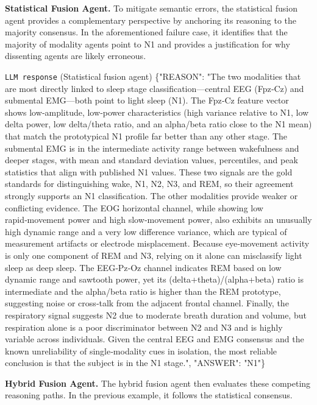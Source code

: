 \noindent \textbf{Statistical Fusion Agent.} To mitigate semantic errors, the statistical fusion agent provides a complementary perspective by anchoring its reasoning to the majority consensus. In the aforementioned failure case, it identifies that the majority of modality agents point to N1 and provides a justification for why dissenting agents are likely erroneous.

\begin{promptbox}{\texttt{LLM response} (Statistical fusion agent)}
\{"REASON": "The two modalities that are most directly linked to sleep stage classification—central EEG (Fpz‑Cz) and submental EMG—both point to light sleep (N1). The Fpz‑Cz feature vector shows low‑amplitude, low‑power characteristics (high variance relative to N1, low delta power, low delta/theta ratio, and an alpha/beta ratio close to the N1 mean) that match the prototypical N1 profile far better than any other stage. The submental EMG is in the intermediate activity range between wakefulness and deeper stages, with mean and standard deviation values, percentiles, and peak statistics that align with published N1 values. These two signals are the gold standards for distinguishing wake, N1, N2, N3, and REM, so their agreement strongly supports an N1 classification. The other modalities provide weaker or conflicting evidence. The EOG horizontal channel, while showing low rapid‑movement power and high slow‑movement power, also exhibits an unusually high dynamic range and a very low difference variance, which are typical of measurement artifacts or electrode misplacement. Because eye‑movement activity is only one component of REM and N3, relying on it alone can misclassify light sleep as deep sleep. The EEG‑Pz‑Oz channel indicates REM based on low dynamic range and sawtooth power, yet its (delta+theta)/(alpha+beta) ratio is intermediate and the alpha/beta ratio is higher than the REM prototype, suggesting noise or cross‑talk from the adjacent frontal channel. Finally, the respiratory signal suggests N2 due to moderate breath duration and volume, but respiration alone is a poor discriminator between N2 and N3 and is highly variable across individuals. Given the central EEG and EMG consensus and the known unreliability of single‑modality cues in isolation, the most reliable conclusion is that the subject is in the N1 stage.", "ANSWER": "N1"\}
\end{promptbox}

\noindent \textbf{Hybrid Fusion Agent.} The hybrid fusion agent then evaluates these competing reasoning paths. In the previous example, it follows the statistical consensus. 

